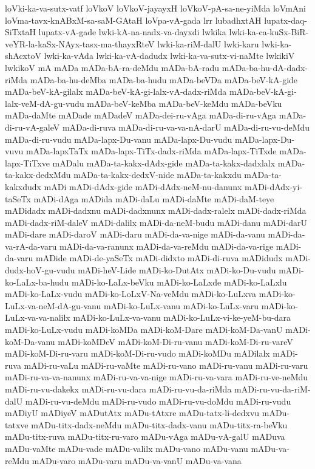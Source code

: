 {loVki-ka-va-sutx-vatf
loVkoV
loVkoV-jayayxH
loVkoV-pA-sa-ne-yiMda
loVmAni
loVma-tavx-knABxM-sa-saM-GAtaH
loVpa-vA-gada
lrr
lubadhxtAH
lupatx-daq-SiTxtaH
lupatx-vA-gade
lwki-kA-na-nadx-va-dayxdi
lwkika
lwki-ka-ca-kuSx-BiR-veYR-la-kaSx-NAyx-tasx-ma-thayxRteV
lwki-ka-riM-dalU
lwki-karu
lwki-ka-shAcxtoV
lwki-ka-vAda
lwki-ka-vA-dadudx
lwki-ka-va-sutx-vi-naMte
lwkikiV
lwkikoV
mA
mADa
mADa-bA-ra-deMdu
mADa-bA-radu
mADa-ba-hu-dA-dadx-riMda
mADa-ba-hu-deMba
mADa-ba-hudu
mADa-beVDa
mADa-beV-kA-gide
mADa-beV-kA-gilalx
mADa-beV-kA-gi-lalx-vA-dadx-riMda
mADa-beV-kA-gi-lalx-veM-dA-gu-vudu
mADa-beV-keMba
mADa-beV-keMdu
mADa-beVku
mADa-daMte
mADade
mADadeV
mADa-dei-ru-vAga
mADa-di-ru-vAga
mADa-di-ru-vA-galeV
mADa-di-ruva
mADa-di-ru-va-va-nA-darU
mADa-di-ru-vu-deMdu
mADa-di-ru-vudu
mADa-lapx-Du-vanu
mADa-lapx-Du-vudu
mADa-lapx-Du-vuvu
mADa-lapxTaTx
mADa-lapx-TiTx-dadx-riMda
mADa-lapx-TiTxde
mADa-lapx-TiTxve
mADalu
mADa-ta-kakx-dAdx-gide
mADa-ta-kakx-dadxlalx
mADa-ta-kakx-dedxMdu
mADa-ta-kakx-dedxV-nide
mADa-ta-kakxdu
mADa-ta-kakxdudx
mADi
mADi-dAdx-gide
mADi-dAdx-neM-nu-danunx
mADi-dAdx-yi-taSeTx
mADi-dAga
mADida
mADi-daLu
mADi-daMte
mADi-daM-teye
mADidadx
mADi-dadxnu
mADi-dadxnunx
mADi-dadx-ralelx
mADi-dadx-riMda
mADi-dadx-riM-daleV
mADi-dalilx
mADi-da-neM-budu
mADi-danu
mADi-darU
mADi-dare
mADi-daroV
mADi-daru
mADi-da-va-nige
mADi-da-vanu
mADi-da-va-rA-da-varu
mADi-da-va-ranunx
mADi-da-va-reMdu
mADi-da-va-rige
mADi-da-varu
mADide
mADi-de-yaSeTx
mADi-didxto
mADi-di-ruva
mADidudx
mADi-dudx-hoV-gu-vudu
mADi-heV-Lide
mADi-ko-DutAtx
mADi-ko-Du-vudu
mADi-ko-LaLx-ba-hudu
mADi-ko-LaLx-beVku
mADi-ko-LaLxde
mADi-ko-LaLxlu
mADi-ko-LaLx-vudu
mADi-ko-LoLxV-Na-veMdu
mADi-ko-LuLxva
mADi-ko-LuLx-va-neM-dA-gu-vanu
mADi-ko-LuLx-vanu
mADi-ko-LuLx-varu
mADi-ko-LuLx-va-va-nalilx
mADi-ko-LuLx-va-vanu
mADi-ko-LuLx-vi-ke-yeM-bu-dara
mADi-ko-LuLx-vudu
mADi-koMDa
mADi-koM-Dare
mADi-koM-Da-vanU
mADi-koM-Da-vanu
mADi-koMDeV
mADi-koM-Di-ru-vanu
mADi-koM-Di-ru-vareV
mADi-koM-Di-ru-varu
mADi-koM-Di-ru-vudo
mADi-koMDu
mADilalx
mADi-ruva
mADi-ru-vaLu
mADi-ru-vaMte
mADi-ru-vano
mADi-ru-vanu
mADi-ru-varu
mADi-ru-va-va-nanunx
mADi-ru-va-va-nige
mADi-ru-va-vara
mADi-ru-ve-neMdu
mADi-ru-vu-dakekx
mADi-ru-vu-dara
mADi-ru-vu-da-riMda
mADi-ru-vu-da-riM-dalU
mADi-ru-vu-deMdu
mADi-ru-vudo
mADi-ru-vu-doMdu
mADi-ru-vudu
mADiyU
mADiyeV
mADutAtx
mADu-tAtxre
mADu-tatx-li-dedxvu
mADu-tatxve
mADu-titx-dadx-neMdu
mADu-titx-dadx-vanu
mADu-titx-ra-beVku
mADu-titx-ruva
mADu-titx-ru-varo
mADu-vAga
mADu-vA-galU
mADuva
mADu-vaMte
mADu-vade
mADu-valilx
mADu-vano
mADu-vanu
mADu-va-reMdu
mADu-varo
mADu-varu
mADu-va-vanU
mADu-va-vana
}
